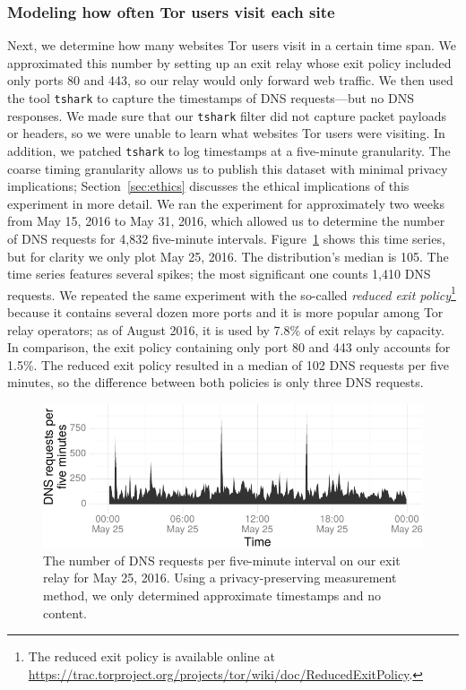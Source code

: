 \subsubsection{Modeling how often Tor users visit each site}
\label{sec:load-freq}
Next, we determine how many websites Tor users visit in a certain time span.
We approximated this number by setting up an exit relay whose exit policy
included only ports 80 and 443, so our relay would only forward web traffic.  We
then used the tool {\tt tshark} to capture the timestamps of DNS requests---but
no DNS responses.  We made sure that our {\tt tshark} filter did not capture
packet payloads or headers, so we were unable to learn what websites Tor users
were visiting.  In addition, we patched {\tt tshark} to log timestamps at a
five-minute granularity. The coarse timing granularity allows us to publish this
dataset with minimal privacy implications; Section~\ref{sec:ethics} discusses
the ethical implications of this experiment in more detail.  We ran the
experiment for approximately two weeks from May 15, 2016 to May 31, 2016, which
allowed us to determine the number of DNS requests for 4,832 five-minute
intervals.  Figure~\ref{fig:dns-reqs} shows this time series, but for clarity we
only plot May 25, 2016.  The distribution's median is 105.
The time series features several spikes; the most
significant one counts 1,410 DNS requests.  We repeated the same experiment with
the so-called \emph{reduced exit policy}\footnote{The reduced exit policy is
	available online at
\url{https://trac.torproject.org/projects/tor/wiki/doc/ReducedExitPolicy}.}
because it contains several dozen more ports and it is more popular among Tor
relay operators; as of August 2016, it is used by 7.8\% of exit relays by
capacity.  In comparison, the exit policy containing only port 80 and 443 only
accounts for 1.5\%.  The reduced exit policy resulted in a median of 102 DNS
requests per five minutes, so the difference between both policies is only three
DNS requests.

\begin{figure}[t]
	\centering
	\includegraphics[width=\linewidth]{figures/dns-requests.pdf}
	\caption{The number of DNS requests per five-minute interval on our
	exit relay for May 25, 2016.  Using a privacy-preserving measurement method,
    we only determined approximate timestamps and no content.}
	\label{fig:dns-reqs}
\end{figure}

